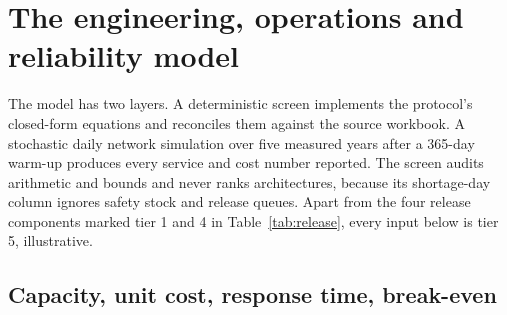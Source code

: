 \section{The engineering, operations and reliability model}
\label{sec:model}

The model has two layers. A deterministic screen implements the protocol's closed-form
equations and reconciles them against the source workbook. A stochastic daily network
simulation over five measured years after a 365-day warm-up produces every service and cost
number reported. The screen audits arithmetic and bounds and never ranks architectures, because
its shortage-day column ignores safety stock and release queues. Apart from the four release
components marked tier 1 and 4 in Table~\ref{tab:release}, every input below is tier 5,
illustrative.

\subsection{Capacity, unit cost, response time, break-even}

